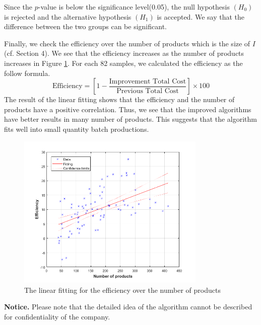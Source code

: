 Since the $p$-value is below the significance level(0.05), the null hypothesis $(H_{0})$ is rejected and the alternative hypothesis $(H_{1})$ is accepted. We say that the difference between the two groups can be significant.

Finally, we check the efficiency over the number of products which is the size of $I$(cf. Section 4).
We see that the efficiency increases as the number of products increases in Figure \ref{fig:LinearFitting}.
For each 82 samples, we calculated the efficiency as the follow formula.
\begin{equation}
	\textrm{Efficiency} = \left[1-\frac{\textrm{Improvement~Total~Cost}}{\textrm{Previous~Total~Cost}}\right]\times 100
\end{equation}
The result of the linear fitting shows that the efficiency and the number of products have a positive correlation.
Thus, we see that the improved algorithms have better results in many number of products.
This suggests that the algorithm fits well into small quantity batch productions.


\begin{figure}[h!]
	\centering
	\includegraphics[width=9cm]{Graph_3.png}
	\caption{The linear fitting for the efficiency over the number of products}
	\label{fig:LinearFitting}       %
\end{figure}


{\bf Notice.} Please note that the detailed idea of the algorithm cannot be described for confidentiality of the company.

